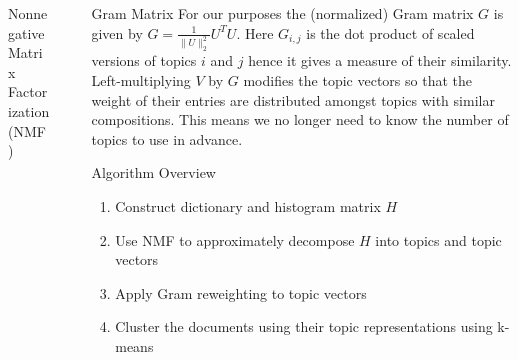 \documentclass[final]{beamer}
\newlength{\sepwid}
\newlength{\onecolwid}
\newlength{\twocolwid}
\begin{document}
\begin{frame}[t]
\begin{columns}[t]
\begin{column}{\onecolwid}
\begin{block}{Nonnegative Matrix Factorization (NMF)}
\end{block}





\end{column} %

\begin{column}{\sepwid}\end{column} %

\begin{column}{\twocolwid} %

\begin{columns}[t,totalwidth=\twocolwid] %

\begin{column}{\onecolwid}\vspace{-.6in} %


\begin{block}{Gram Matrix}
For our purposes the (normalized) Gram matrix $G$ is given by
$G=\tfrac{1}{\|U\|_2^2}U^TU$.
Here $G_{i,j}$ is the dot product of scaled versions of topics $i$ and $j$ hence it gives a measure of their similarity.
Left-multiplying $V$ by $G$ modifies the topic vectors so that the weight of their entries are distributed amongst topics with similar compositions. This means we no longer need to know the number of topics to use in advance.


\end{block}





\begin{block}{Algorithm Overview}
\begin{enumerate}
	\item Construct dictionary and histogram matrix $H$
	\item Use NMF to approximately decompose $H$ into topics and topic vectors
	\item Apply Gram reweighting to topic vectors
	\item Cluster the documents using their topic representations using k-means
\end{enumerate}


\end{block}
\end{column}
\end{columns}
\end{column}
\end{columns}
\end{frame}
\end{document}
